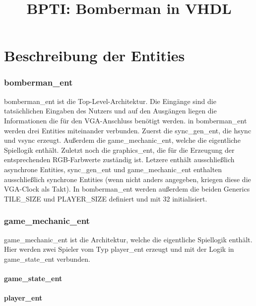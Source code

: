 \documentclass[parskip=full]{scrartcl}
\title{BPTI: Bomberman in VHDL}
\begin{document}
	\maketitle
	\part{Beschreibung der Entities}
		\section{bomberman\_ent}
			bomberman\_ent ist die Top-Level-Architektur. Die Eingänge sind die tatsächlichen Eingaben des Nutzers und auf den Ausgängen liegen die Informationen die für den VGA-Anschluss benötigt werden. in bomberman\_ent werden drei Entities miteinander verbunden. Zuerst die sync\_gen\_ent, die hsync und vsync erzeugt. Außerdem die game\_mechanic\_ent, welche die eigentliche Spiellogik enthält. Zuletzt noch die graphics\_ent, die für die Erzeugung der entsprechenden RGB-Farbwerte zuständig ist. 
			Letzere enthält ausschließlich asynchrone Entities, sync\_gen\_ent und game\_mechanic\_ent enthalten ausschließlich synchrone Entities (wenn nicht anders angegeben, kriegen diese die VGA-Clock als Takt).
			In bomberman\_ent werden außerdem die beiden Generics TILE\_SIZE und PLAYER\_SIZE definiert und mit 32 initialisiert.
		
		\section{game\_mechanic\_ent}
			game\_mechanic\_ent ist die Architektur, welche die eigentliche Spiellogik enthält. Hier werden zwei Spieler vom Typ player\_ent erzeugt und mit der Logik in game\_state\_ent verbunden.
		
			\subsection{game\_state\_ent}
			\subsection{player\_ent}
\end{document}
